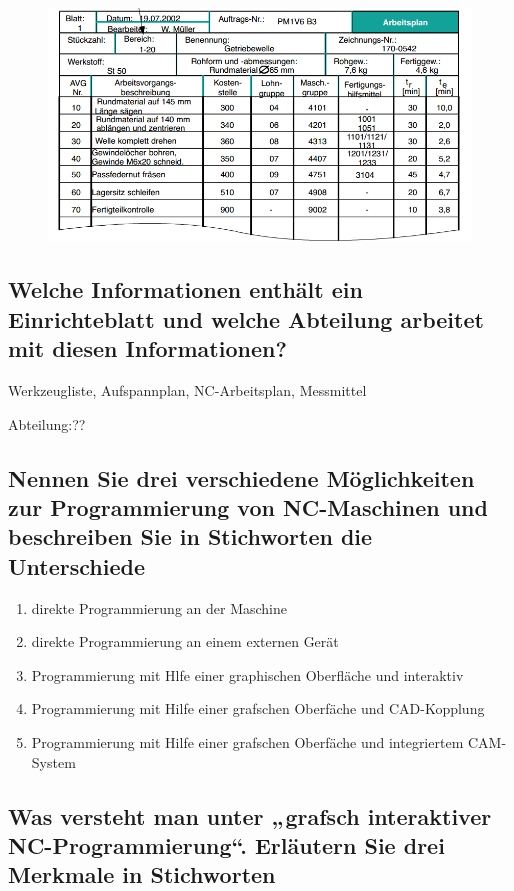\begin{figure}[h]
    \centering
    \includegraphics[scale=0.7]{Bild2_3.png}
\end{figure}

\subsection*{Welche Informationen enthält ein Einrichteblatt und welche Abteilung arbeitet mit diesen Informationen?}

Werkzeugliste, Aufspannplan, NC-Arbeitsplan, Messmittel

Abteilung:??

\subsection*{Nennen Sie drei verschiedene Möglichkeiten zur Programmierung von NC-Maschinen und beschreiben Sie in Stichworten die Unterschiede}

\begin{enumerate}[1)]
    \item direkte Programmierung an der Maschine
    \item direkte Programmierung an einem externen Gerät
    \item Programmierung mit Hlfe einer graphischen Oberfläche und interaktiv
    \item Programmierung mit Hilfe einer grafschen Oberfäche und CAD-Kopplung
    \item Programmierung mit Hilfe einer grafschen Oberfäche und integriertem CAM-System
\end{enumerate}

\subsection*{Was versteht man unter „grafsch interaktiver NC-Programmierung“. Erläutern Sie drei Merkmale in Stichworten}

